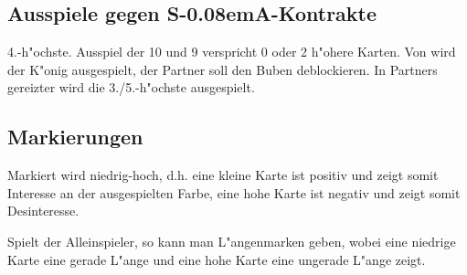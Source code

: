 \documentclass[11pt,german,twocolumn]{scrartcl}
\def\sa{\nobreak\textsf{S\kern-0.08emA}\xspace}
\begin{document}
\subsection{Ausspiele gegen \sa-Kontrakte}

4.-h"ochste. Ausspiel der 10 und 9 verspricht 0 oder 2 h"ohere Karten. Von
 wird der K"onig ausgespielt, der Partner soll den Buben deblockieren. In
Partners gereizter wird die 3./5.-h"ochste ausgespielt.

\subsection{Markierungen}

Markiert wird niedrig-hoch, d.h. eine kleine Karte ist positiv und zeigt somit
Interesse an der ausgespielten Farbe, eine hohe Karte ist negativ und zeigt
somit Desinteresse.

Spielt der Alleinspieler, so kann man L"angenmarken geben, wobei eine niedrige
Karte eine gerade L"ange und eine hohe Karte eine ungerade L"ange zeigt.
\end{document}
